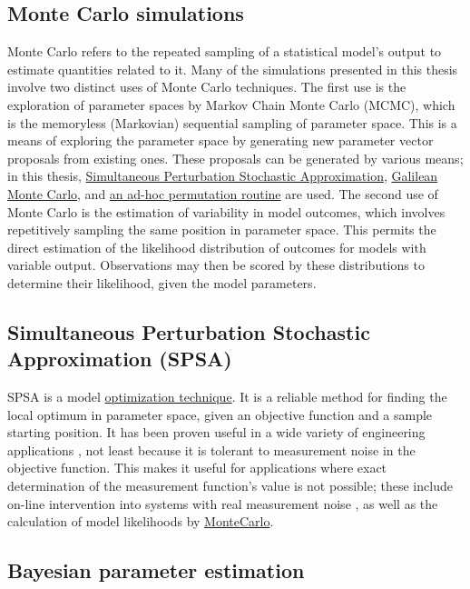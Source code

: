 \subsection{Monte Carlo simulations}
\label{ssec:MonteCarlo}
Monte Carlo refers to the repeated sampling of a statistical model's output to estimate quantities related to it. Many of the simulations presented in this thesis involve two distinct uses of Monte Carlo techniques. The first use is the exploration of parameter spaces by Markov Chain Monte Carlo (MCMC), which is the memoryless (Markovian) sequential sampling of parameter space. This is a means of exploring the parameter space by generating new parameter vector proposals from existing ones. These proposals can be generated by various means; in this thesis, \hyperref[ssec:SPSA]{Simultaneous Perturbation Stochastic Approximation}, \hyperref[ssec:GMC]{Galilean Monte Carlo}, and \hyperref[ssec:adhoc]{an ad-hoc permutation routine} are used. The second use of Monte Carlo is the estimation of variability in model outcomes, which involves repetitively sampling the same position in parameter space. This permits the direct estimation of the likelihood distribution of outcomes for models with variable output. Observations may then be scored by these distributions to determine their likelihood, given the model parameters.

\subsection{Simultaneous Perturbation Stochastic Approximation (SPSA)}
\label{ssec:SPSA}
SPSA is a model \hyperref[sampleoptim]{optimization technique}. It is a reliable method for finding the local optimum in parameter space, given an objective function and a sample starting position. It has been proven useful in a wide variety of engineering applications \cite{Kleinman1997,Zhou2008}, not least because it is tolerant to measurement noise in the objective function. This makes it useful for applications where exact determination of the measurement function's value is not possible; these include on-line intervention into systems with real measurement noise \cite{Zhou2008}, as well as the calculation of model likelihoods by \hyperref[ssec:MonteCarlo]{MonteCarlo}.

\subsection{Bayesian parameter estimation}
\label{ssec:Bayes}
